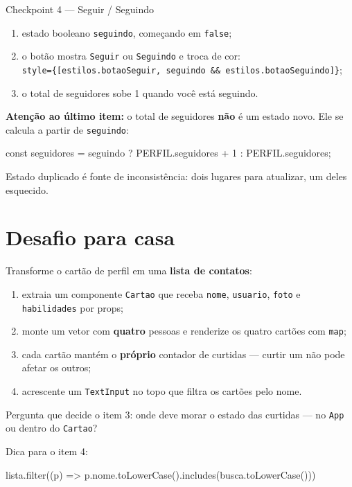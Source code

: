 \documentclass[11pt,a4paper]{article}
\newcommand{\cod}[1]{\texttt{#1}}
\newcommand{\caixa}{\(\square\)}
\begin{document}
\begin{tarefa}{Checkpoint 4 --- Seguir / Seguindo}
\begin{enumerate}[label=\caixa]
  \item estado booleano \cod{seguindo}, começando em \cod{false};
  \item o botão mostra \cod{Seguir} ou \cod{Seguindo} e troca de cor:\\
        \cod{style=\{[estilos.botaoSeguir, seguindo \&\& estilos.botaoSeguindo]\}};
  \item o total de seguidores sobe 1 quando você está seguindo.
\end{enumerate}
\textbf{Atenção ao último item:} o total de seguidores \textbf{não} é um estado novo.
Ele se calcula a partir de \cod{seguindo}:
\begin{codigo}
const seguidores = seguindo ? PERFIL.seguidores + 1 : PERFIL.seguidores;
\end{codigo}
Estado duplicado é fonte de inconsistência: dois lugares para atualizar, um deles esquecido.
\end{tarefa}

\section{Desafio para casa}
Transforme o cartão de perfil em uma \textbf{lista de contatos}:
\begin{enumerate}
  \item extraia um componente \cod{Cartao} que receba \cod{nome}, \cod{usuario}, \cod{foto} e
        \cod{habilidades} por props;
  \item monte um vetor com \textbf{quatro} pessoas e renderize os quatro cartões com \cod{map};
  \item cada cartão mantém o \textbf{próprio} contador de curtidas --- curtir um não pode afetar os outros;
  \item acrescente um \cod{TextInput} no topo que filtra os cartões pelo nome.
\end{enumerate}
Pergunta que decide o item 3: onde deve morar o estado das curtidas --- no \cod{App}
ou dentro do \cod{Cartao}?

Dica para o item 4:
\begin{codigo}
lista.filter((p) => p.nome.toLowerCase().includes(busca.toLowerCase()))
\end{codigo}
\end{document}
